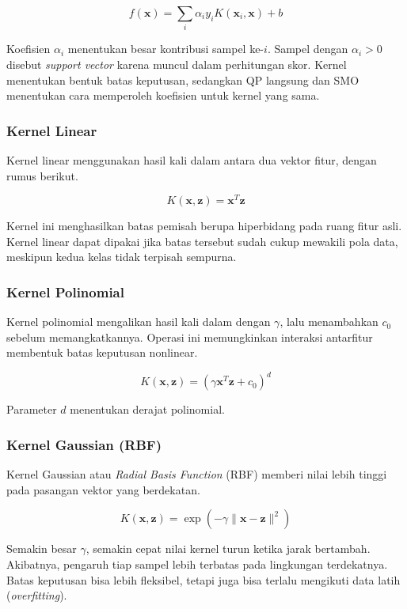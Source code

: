 \[
f(\mathbf{x})=
\sum_i\alpha_i y_i K(\mathbf{x}_i,\mathbf{x})+b
\]

Koefisien $\alpha_i$ menentukan besar kontribusi sampel ke-$i$.
Sampel dengan $\alpha_i>0$ disebut \textit{support vector} karena muncul
dalam perhitungan skor. Kernel menentukan bentuk batas keputusan, sedangkan
QP langsung dan SMO menentukan cara memperoleh koefisien untuk kernel yang
sama.

\subsubsection{Kernel Linear}
Kernel linear menggunakan hasil kali dalam antara dua vektor fitur, dengan rumus berikut.

\[
K(\mathbf{x},\mathbf{z})=\mathbf{x}^{T}\mathbf{z}
\]

Kernel ini menghasilkan batas pemisah berupa hiperbidang pada ruang
fitur asli. Kernel linear dapat dipakai jika batas tersebut sudah cukup
mewakili pola data, meskipun kedua kelas tidak terpisah sempurna.

\subsubsection{Kernel Polinomial}
Kernel polinomial mengalikan hasil kali dalam dengan $\gamma$, lalu
menambahkan $c_0$ sebelum memangkatkannya. Operasi ini memungkinkan
interaksi antarfitur membentuk batas keputusan nonlinear.

\[
K(\mathbf{x},\mathbf{z})=
(\gamma\mathbf{x}^{T}\mathbf{z}+c_0)^d
\]

Parameter $d$ menentukan derajat polinomial.

\subsubsection{Kernel Gaussian (RBF)}
Kernel Gaussian atau \textit{Radial Basis Function} (RBF) memberi nilai
lebih tinggi pada pasangan vektor yang berdekatan.

\[
K(\mathbf{x},\mathbf{z})=
\exp\left(-\gamma\lVert\mathbf{x}-\mathbf{z}\rVert^2\right)
\]

Semakin besar $\gamma$, semakin cepat nilai kernel turun ketika jarak
bertambah. Akibatnya, pengaruh tiap sampel lebih terbatas pada lingkungan
terdekatnya. Batas keputusan bisa lebih fleksibel, tetapi juga bisa terlalu
mengikuti data latih (\textit{overfitting}).

